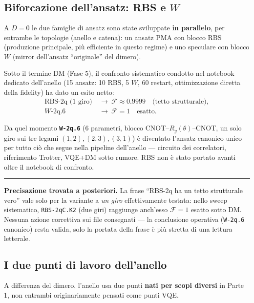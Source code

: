 \documentclass[11pt,a4paper]{article}
\begin{document}
\subsection{Biforcazione dell'ansatz: RBS e $W$}

A $D=0$ le due famiglie di ansatz sono state sviluppate \textbf{in
parallelo}, per entrambe le topologie (anello e catena): un ansatz PMA con
blocco RBS (produzione principale, più efficiente in questo regime) e uno
speculare con blocco $W$ (mirror dell'ansatz ``originale'' del dimero).

Sotto il termine DM (Fase 5), il confronto sistematico condotto nel notebook
dedicato dell'anello (15 ansatz: 10 RBS, 5 $W$, 60 restart, ottimizzazione
diretta della fidelity) ha dato un esito netto:
\begin{align*}
\text{RBS-2q (1 giro)} &\ \to\ \mathcal F\approx0.9999\quad\text{(tetto strutturale)},\\
W\text{-2q.6} &\ \to\ \mathcal F=1\quad\text{esatto}.
\end{align*}

Da quel momento \textbf{\texttt{W-2q.6}} (6 parametri, blocco
CNOT--$R_y(\theta)$--CNOT, un solo giro sui tre legami $(1,2),(2,3),(3,1)$) è
diventato l'ansatz canonico unico per tutto ciò che segue nella pipeline
dell'anello --- circuito dei correlatori, riferimento Trotter, VQE+DM sotto
rumore. RBS non è stato portato avanti oltre il notebook di confronto.

\begin{center}
\begin{minipage}{0.93\textwidth}
\small\textcolor{rossos}{\rule{2.2em}{1.1pt}}\enspace
\textcolor{rossos}{\textbf{Precisazione trovata a posteriori.}}\enspace
La frase ``RBS-2q ha un tetto strutturale vero'' vale solo per la variante a
\emph{un giro} effettivamente testata: nello sweep sistematico, \texttt{RBS-2qC.K2}
(due giri) raggiunge anch'esso $\mathcal F=1$ esatto sotto DM. Nessuna azione
correttiva sui file consegnati --- la conclusione operativa (\texttt{W-2q.6}
canonico) resta valida, solo la portata della frase è più stretta di una
lettura letterale.
\end{minipage}
\end{center}
\medskip

\subsection{I due punti di lavoro dell'anello}

A differenza del dimero, l'anello usa due punti \textbf{nati per scopi
diversi} in Parte 1, non entrambi originariamente pensati come punti VQE.
\end{document}

